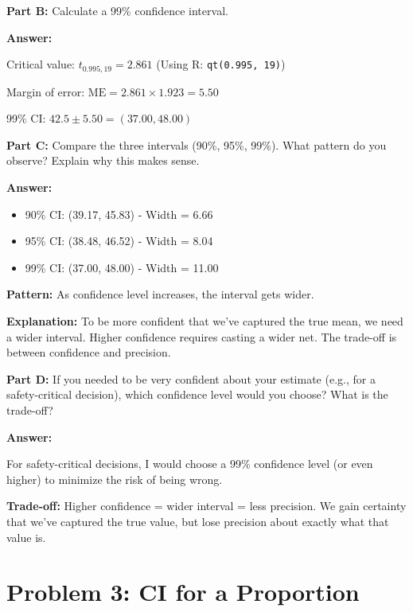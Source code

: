 \documentclass[11pt]{article}
\begin{document}
\textbf{Part B:} Calculate a 99\% confidence interval.

\textcolor{answergreen}{\textbf{Answer:}}

Critical value: $t_{0.995, 19} = 2.861$ (Using R: \texttt{qt(0.995, 19)})

Margin of error: $\text{ME} = 2.861 \times 1.923 = 5.50$

99\% CI: $42.5 \pm 5.50 = (37.00, 48.00)$

\vspace{6pt}

\textbf{Part C:} Compare the three intervals (90\%, 95\%, 99\%). What pattern do you observe? Explain why this makes sense.

\textcolor{answergreen}{\textbf{Answer:}}

\begin{itemize}
\item 90\% CI: (39.17, 45.83) - Width = 6.66
\item 95\% CI: (38.48, 46.52) - Width = 8.04
\item 99\% CI: (37.00, 48.00) - Width = 11.00
\end{itemize}

\textbf{Pattern:} As confidence level increases, the interval gets wider.

\textbf{Explanation:} To be more confident that we've captured the true mean, we need a wider interval. Higher confidence requires casting a wider net. The trade-off is between confidence and precision.

\vspace{6pt}

\textbf{Part D:} If you needed to be very confident about your estimate (e.g., for a safety-critical decision), which confidence level would you choose? What is the trade-off?

\textcolor{answergreen}{\textbf{Answer:}}

For safety-critical decisions, I would choose a 99\% confidence level (or even higher) to minimize the risk of being wrong.

\textbf{Trade-off:} Higher confidence = wider interval = less precision. We gain certainty that we've captured the true value, but lose precision about exactly what that value is.

\newpage

\section{Problem 3: CI for a Proportion}
\end{document}
